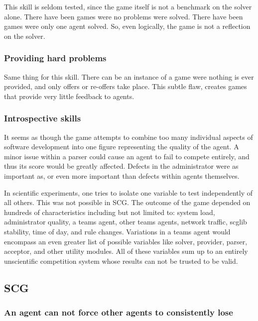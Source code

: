 \documentclass[letterpaper,12pt,oneside]{article}
\begin{document}
This skill is seldom tested, since the game itself is not a benchmark on
the solver alone. There have been games were no problems were solved. There
have been games were only one agent solved. So, even logically, the game is
not a reflection on the solver.

\subsubsection{Providing hard problems}

Same thing for this skill. There can be an instance of a game were nothing
is ever provided, and only offers or re-offers take place. This subtle flaw,
   creates games that provide very little feedback to agents.

\subsubsection{Introspective skills}
It seems as though the game attempts to combine too many individual aspects of
software development into one figure representing the quality of the agent.
A minor issue within a parser could cause an agent to fail to compete
entirely, and thus its score would be greatly affected. Defects in the
administrator were as important as, or even more important than defects within
agents themselves.

In scientific experiments, one tries to isolate one variable
to test independently of all others. This was not possible in SCG. The
outcome of the game depended on hundreds of characteristics including but not
limited to: system load, administrator quality, a teams agent, other teams
agents, network traffic, scglib stability, time of day, and rule changes.
Variations in a teams agent would encompass an even greater list of possible
variables like solver, provider, parser, acceptor, and other utility modules.
All of these variables sum up to an entirely unscientific competition system
whose results can not be trusted to be valid.

\subsection{SCG}

\subsubsection{An agent can not force other agents to consistently lose}
\end{document}

